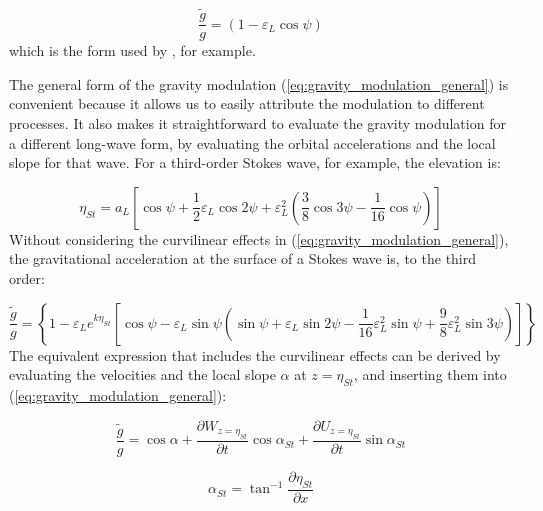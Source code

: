 \documentclass[lineno]{jfm}
\begin{document}
\begin{equation}
\label{eq:gravity_modulation_linear_no_curvature_mean_level}
\frac{\widetilde{g}}{g} = \left( 1 - \varepsilon_L \cos{\psi} \right)
\end{equation}
which is the form used by \citet{peureux2021unsteady}, for example.

The general form of the gravity modulation (\ref{eq:gravity_modulation_general})
is convenient because it allows us to easily attribute the modulation to
different processes.
It also makes it straightforward to evaluate the gravity modulation for a
different long-wave form, by evaluating the orbital accelerations and the local
slope for that wave.
For a third-order Stokes wave, for example, the elevation is:

\begin{equation}
\label{eq:eta_stokes}
\eta_{St} = a_L \left[
  \cos{\psi} +
  \dfrac{1}{2} \varepsilon_L \cos{2\psi} +
  \varepsilon_L^2 \left( \dfrac{3}{8} \cos{3\psi} - \dfrac{1}{16} \cos{\psi} \right)
\right]
\end{equation}
Without considering the curvilinear effects in (\ref{eq:gravity_modulation_general}),
the gravitational acceleration at the surface of a Stokes wave is, to the third
order:

\begin{equation}
\label{eq:gravity_modulation_stokes}
\frac{\widetilde{g}}{g} =
\left\{
  1 - \varepsilon_L e^{k \eta_{St}}
  \left[ \cos{\psi} -
    \varepsilon_L \sin{\psi} \left(
      \sin{\psi}
      + \varepsilon_L \sin{2\psi}
      - \dfrac{1}{16} \varepsilon_L^2 \sin{\psi}
      + \dfrac{9}{8} \varepsilon_L^2 \sin{3\psi}
    \right)
  \right]
\right\}
\end{equation}
The equivalent expression that includes the curvilinear effects can be derived
by evaluating the velocities and the local slope $\alpha$ at $z = \eta_{St}$,
and inserting them into (\ref{eq:gravity_modulation_general}):

\begin{equation}
\label{eq:gravity_modulation_general_stokes}
\frac{\widetilde{g}}{g}
  = \cos{\alpha} 
  + \dfrac{\partial W_{z=\eta_{St}}}{\partial t} \cos{\alpha_{St}}
  + \dfrac{\partial U_{z=\eta_{St}}}{\partial t} \sin{\alpha_{St}}
\end{equation}

\begin{equation}
\label{eq:local_slope_stokes}
\alpha_{St} = \tan^{-1}{\dfrac{\partial \eta_{St}}{\partial x}}
\end{equation}
\end{document}
